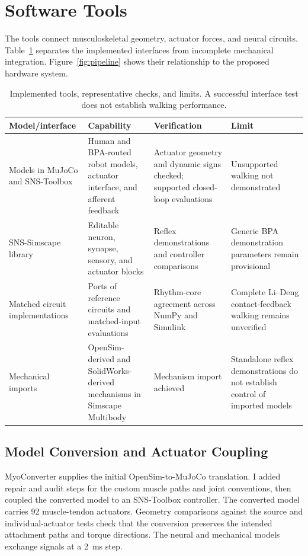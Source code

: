 \section{Software Tools}\label{sec:preliminary_sim_methods}

The tools connect musculoskeletal geometry, actuator forces, and neural circuits. Table~\ref{tab:sns_capability} separates the implemented interfaces from incomplete mechanical integration. Figure~\ref{fig:pipeline} shows their relationship to the proposed hardware system.

\begin{table}[htbp]
\caption[Neuromechanical tools and verification scope]{Implemented tools, representative checks, and limits. A successful interface test does not establish walking performance.}
\label{tab:sns_capability}
\small
\begin{tabularx}{\textwidth}{@{}>{\raggedright\arraybackslash}p{}*{3}{>{\raggedright\arraybackslash}X}@{}}
\toprule
\textbf{Model/interface} & \textbf{Capability} & \textbf{Verification} & \textbf{Limit} \\
\midrule
Models in MuJoCo and SNS-Toolbox & Human and BPA-routed robot models, actuator interface, and afferent feedback & Actuator geometry and dynamic signs checked; supported closed-loop evaluations & Unsupported walking not demonstrated \\
SNS-Simscape library & Editable neuron, synapse, sensory, and actuator blocks & Reflex demonstrations and controller comparisons & Generic BPA demonstration parameters remain provisional \\
Matched circuit implementations & Ports of reference circuits and matched-input evaluations & Rhythm-core agreement across NumPy and Simulink & Complete Li--Deng contact-feedback walking remains unverified \\
Mechanical imports & OpenSim-derived and SolidWorks-derived mechanisms in Simscape Multibody & Mechanism import achieved & Standalone reflex demonstrations do not establish control of imported models \\
\bottomrule
\end{tabularx}
\end{table}

\subsection{Model Conversion and Actuator Coupling}\label{sec:sns_existing_tools}

MyoConverter supplies the initial OpenSim-to-MuJoCo translation. I added repair and audit steps for the custom muscle paths and joint conventions, then coupled the converted model to an SNS-Toolbox controller. The converted model carries 92 muscle-tendon actuators. Geometry comparisons against the source and individual-actuator tests check that the conversion preserves the intended attachment paths and torque directions. The neural and mechanical models exchange signals at a \qty{2}{\milli\second} step.

